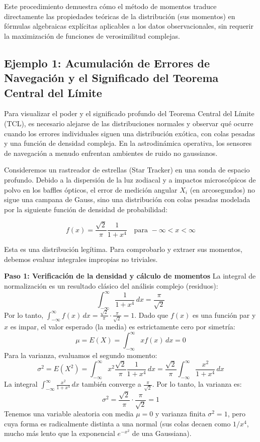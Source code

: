 Este procedimiento demuestra cómo el método de momentos traduce directamente las propiedades teóricas de la distribución (sus momentos) en fórmulas algebraicas explícitas aplicables a los datos observacionales, sin requerir la maximización de funciones de verosimilitud complejas.


\subsection{Ejemplo 1: Acumulación de Errores de Navegación y el Significado del Teorema Central del Límite}

Para visualizar el poder y el significado profundo del Teorema Central del Límite (TCL), es necesario alejarse de las distribuciones normales y observar qué ocurre cuando los errores individuales siguen una distribución exótica, con colas pesadas y una función de densidad compleja. En la astrodinámica operativa, los sensores de navegación a menudo enfrentan ambientes de ruido no gaussianos.

Consideremos un rastreador de estrellas (Star Tracker) en una sonda de espacio profundo. Debido a la dispersión de la luz zodiacal y a impactos microscópicos de polvo en los baffles ópticos, el error de medición angular $X_i$ (en arcosegundos) no sigue una campana de Gauss, sino una distribución con colas pesadas modelada por la siguiente función de densidad de probabilidad:

$$ f(x) = \frac{\sqrt{2}}{\pi} \frac{1}{1 + x^4} \quad \text{para } -\infty < x < \infty $$

Esta es una distribución legítima. Para comprobarlo y extraer sus momentos, debemos evaluar integrales impropias no triviales. 

\textbf{Paso 1: Verificación de la densidad y cálculo de momentos}
La integral de normalización es un resultado clásico del análisis complejo (residuos):
$$ \int_{-\infty}^{\infty} \frac{1}{1 + x^4} \, dx = \frac{\pi}{\sqrt{2}} $$
Por lo tanto, $\int_{-\infty}^{\infty} f(x) \, dx = \frac{\sqrt{2}}{\pi} \cdot \frac{\pi}{\sqrt{2}} = 1$. 
Dado que $f(x)$ es una función par y $x$ es impar, el valor esperado (la media) es estrictamente cero por simetría:
$$ \mu = E(X) = \int_{-\infty}^{\infty} x f(x) \, dx = 0 $$
Para la varianza, evaluamos el segundo momento:
$$ \sigma^2 = E(X^2) = \int_{-\infty}^{\infty} x^2 \frac{\sqrt{2}}{\pi} \frac{1}{1 + x^4} \, dx = \frac{\sqrt{2}}{\pi} \int_{-\infty}^{\infty} \frac{x^2}{1 + x^4} \, dx $$
La integral $\int_{-\infty}^{\infty} \frac{x^2}{1 + x^4} \, dx$ también converge a $\frac{\pi}{\sqrt{2}}$. Por lo tanto, la varianza es:
$$ \sigma^2 = \frac{\sqrt{2}}{\pi} \cdot \frac{\pi}{\sqrt{2}} = 1 $$
Tenemos una variable aleatoria con media $\mu = 0$ y varianza finita $\sigma^2 = 1$, pero cuya forma es radicalmente distinta a una normal (sus colas decaen como $1/x^4$, mucho más lento que la exponencial $e^{-x^2}$ de una Gaussiana).

